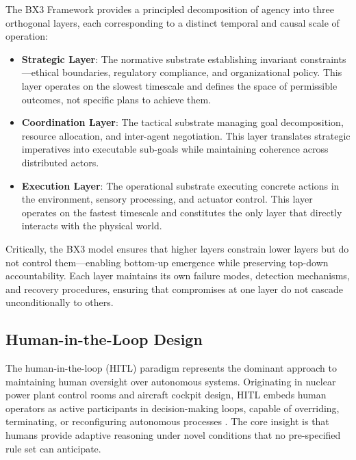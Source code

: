 
The BX3 Framework provides a principled decomposition of agency into three orthogonal layers, each corresponding to a distinct temporal and causal scale of operation:

\begin{itemize}
    \item \textbf{Strategic Layer}: The normative substrate establishing invariant constraints—ethical boundaries, regulatory compliance, and organizational policy. This layer operates on the slowest timescale and defines the space of permissible outcomes, not specific plans to achieve them.
    \item \textbf{Coordination Layer}: The tactical substrate managing goal decomposition, resource allocation, and inter-agent negotiation. This layer translates strategic imperatives into executable sub-goals while maintaining coherence across distributed actors.
    \item \textbf{Execution Layer}: The operational substrate executing concrete actions in the environment, sensory processing, and actuator control. This layer operates on the fastest timescale and constitutes the only layer that directly interacts with the physical world.
\end{itemize}

Critically, the BX3 model ensures that higher layers constrain lower layers but do not control them—enabling bottom-up emergence while preserving top-down accountability. Each layer maintains its own failure modes, detection mechanisms, and recovery procedures, ensuring that compromises at one layer do not cascade unconditionally to others.

\subsection{Human-in-the-Loop Design}

The human-in-the-loop (HITL) paradigm represents the dominant approach to maintaining human oversight over autonomous systems. Originating in nuclear power plant control rooms and aircraft cockpit design, HITL embeds human operators as active participants in decision-making loops, capable of overriding, terminating, or reconfiguring autonomous processes \cite{tristr81}. The core insight is that humans provide adaptive reasoning under novel conditions that no pre-specified rule set can anticipate.

